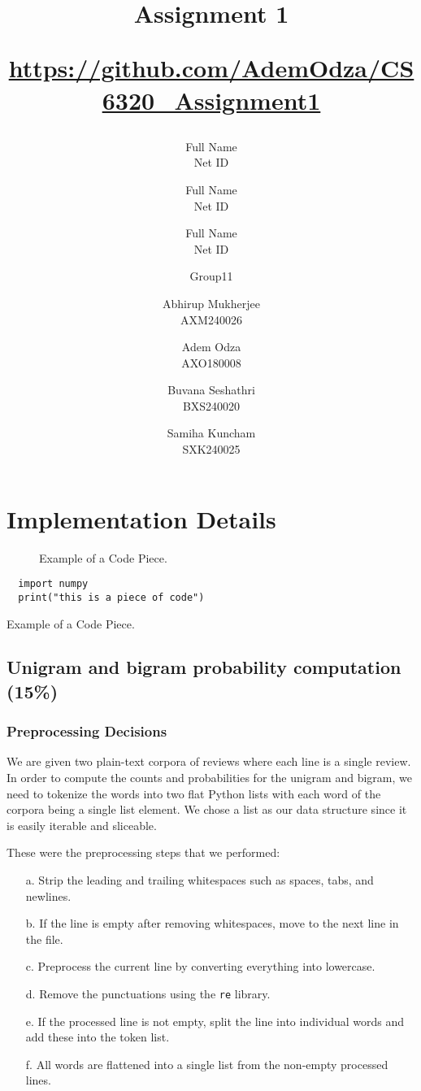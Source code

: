 \documentclass[a4paper]{article}
\title{Assignment 1 \\ \begin{small}\url{https://github.com/AdemOdza/CS6320_Assignment1}\end{small}}
\author{Full Name \\ Net ID \and Full Name \\ Net ID \and Full Name \\ Net ID}
\author{Group11 \and  Abhirup Mukherjee \\ AXM240026 \and Adem Odza \\ AXO180008  \and Buvana Seshathri \\ BXS240020 \and Samiha Kuncham \\SXK240025}
\date{}
\begin{document}
\maketitle



\section{Implementation Details}

\begin{figure}[h]
\centering
\small
{}
\caption{Example of a Code Piece.}
\label{fig:eg}
\end{figure}


\begin{listing}[ht]
\begin{verbatim}
  import numpy  
  print("this is a piece of code")
\end{verbatim}
\caption{Example of a Code Piece.}
\label{lst:eg}
\end{listing}


\subsection{Unigram and bigram probability computation (15\%)}

\subsubsection{Preprocessing Decisions}
We are given two plain-text corpora of reviews where each line is a single review. In order to compute the counts and probabilities for the unigram and bigram, we need to tokenize the words into two flat Python lists with each word of the corpora being a single list element. We chose a list as our data structure since it is easily iterable and sliceable.

These were the preprocessing steps that we performed:
\begin{enumerate}
    \item[a.] Strip the leading and trailing whitespaces such as spaces, tabs, and newlines.
    \item[b.] If the line is empty after removing whitespaces, move to the next line in the file.
    \item[c.] Preprocess the current line by converting everything into lowercase.
    \item[d.] Remove the punctuations using the \texttt{re} library.
    \item[e.] If the processed line is not empty, split the line into individual words and add these into the token list.
    \item[f.] All words are flattened into a single list from the non-empty processed lines.
\end{enumerate}
\end{document}
